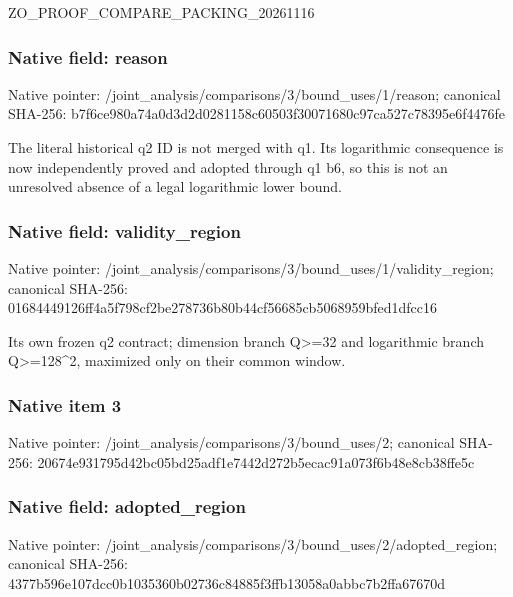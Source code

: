 \documentclass[10pt,a4paper]{article}
\begin{document}
ZO\_PROOF\_COMPARE\_PACKING\_20261116


\subsubsection{Native field: reason}


Native pointer: /joint\_analysis/comparis\allowbreak{}ons/3/bound\_uses/1/reaso\allowbreak{}n; canonical SHA-256: b7f6ce980a74a0d3d2d02811\allowbreak{}58c60503f30071680c97ca52\allowbreak{}7c78395e6f4476fe


The literal historical q2 ID is not merged with q1. Its logarithmic consequence is now independently proved and adopted through q1 b6, so this is not an unresolved absence of a legal logarithmic lower bound.


\subsubsection{Native field: validity\_region}


Native pointer: /joint\_analysis/comparis\allowbreak{}ons/3/bound\_uses/1/valid\allowbreak{}ity\_region; canonical SHA-256: 01684449126ff4a5f798cf2b\allowbreak{}e278736b80b44cf56685cb50\allowbreak{}68959bfed1dfcc16


Its own frozen q2 contract; dimension branch Q>=32 and logarithmic branch Q>=128\textasciicircum{}2, maximized only on their common window.


\subsubsection{Native item 3}


Native pointer: /joint\_analysis/comparis\allowbreak{}ons/3/bound\_uses/2; canonical SHA-256: 20674e931795d42bc05bd25a\allowbreak{}df1e7442d272b5ecac91a073\allowbreak{}f6b48e8cb38ffe5c



\subsubsection{Native field: adopted\_region}


Native pointer: /joint\_analysis/comparis\allowbreak{}ons/3/bound\_uses/2/adopt\allowbreak{}ed\_region; canonical SHA-256: 4377b596e107dcc0b1035360\allowbreak{}b02736c84885f3ffb13058a0\allowbreak{}abbc7b2ffa67670d
\end{document}
